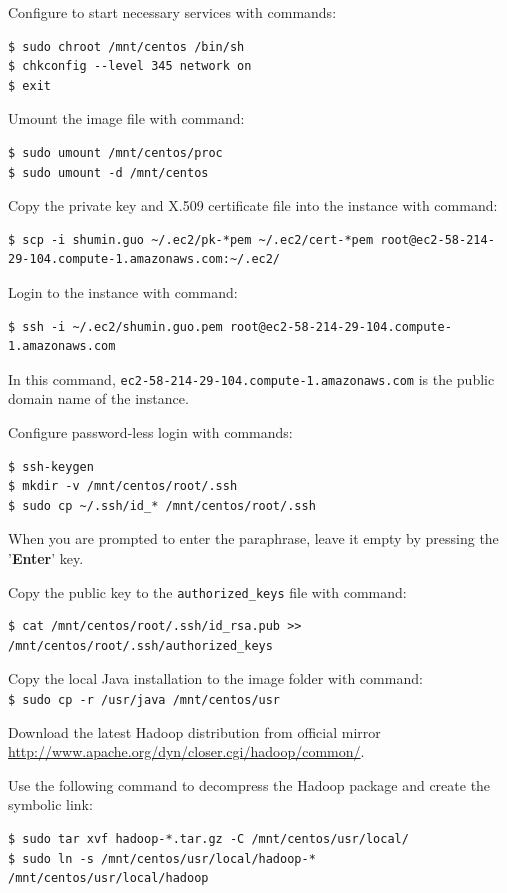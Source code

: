Configure to start necessary services with commands:
\lstset{style=bashstyle}
\begin{lstlisting}
$ sudo chroot /mnt/centos /bin/sh
$ chkconfig --level 345 network on
$ exit
\end{lstlisting}

Umount the image file with command:
\lstset{style=bashstyle}
\begin{lstlisting}
$ sudo umount /mnt/centos/proc
$ sudo umount -d /mnt/centos
\end{lstlisting}

Copy the private key and X.509 certificate file into the instance with command:
\lstset{style=bashstyle}
\begin{lstlisting}
$ scp -i shumin.guo ~/.ec2/pk-*pem ~/.ec2/cert-*pem root@ec2-58-214-29-104.compute-1.amazonaws.com:~/.ec2/
\end{lstlisting}

Login to the instance with command:
\lstset{style=bashstyle}
\begin{lstlisting}
$ ssh -i ~/.ec2/shumin.guo.pem root@ec2-58-214-29-104.compute-1.amazonaws.com
\end{lstlisting}

In this command, \verb|ec2-58-214-29-104.compute-1.amazonaws.com| is the public domain name of the instance.


Configure password-less login with commands:
\lstset{style=bashstyle}
\begin{lstlisting}
$ ssh-keygen
$ mkdir -v /mnt/centos/root/.ssh
$ sudo cp ~/.ssh/id_* /mnt/centos/root/.ssh
\end{lstlisting}

When you are prompted to enter the paraphrase, leave it empty by pressing the '\textbf{Enter}' key.

Copy the public key to the \verb|authorized_keys| file with command:
\lstset{style=bashstyle}
\begin{lstlisting}
$ cat /mnt/centos/root/.ssh/id_rsa.pub >> /mnt/centos/root/.ssh/authorized_keys
\end{lstlisting}

Copy the local Java installation to the image folder with command: \\
\verb|$ sudo cp -r /usr/java /mnt/centos/usr|

Download the latest Hadoop distribution from official mirror \url{http://www.apache.org/dyn/closer.cgi/hadoop/common/}.

Use the following command to decompress the Hadoop package and create the symbolic link:
\lstset{style=bashstyle}
\begin{lstlisting}
$ sudo tar xvf hadoop-*.tar.gz -C /mnt/centos/usr/local/
$ sudo ln -s /mnt/centos/usr/local/hadoop-* /mnt/centos/usr/local/hadoop
\end{lstlisting}

